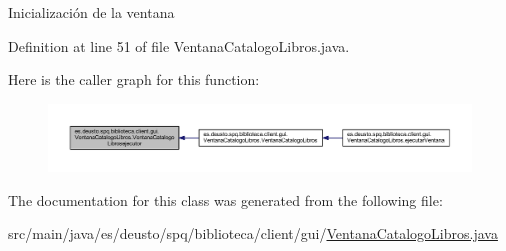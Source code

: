 Inicialización de la ventana 

Definition at line 51 of file Ventana\+Catalogo\+Libros.\+java.

Here is the caller graph for this function\+:
\nopagebreak
\begin{figure}[H]
\begin{center}
\leavevmode
\includegraphics[width=350pt]{classes_1_1deusto_1_1spq_1_1biblioteca_1_1client_1_1gui_1_1_ventana_catalogo_libros_a269ed9764cf7fde7566c875b100ae4de_icgraph}
\end{center}
\end{figure}


The documentation for this class was generated from the following file\+:\begin{DoxyCompactItemize}
\item 
src/main/java/es/deusto/spq/biblioteca/client/gui/\mbox{\hyperlink{_ventana_catalogo_libros_8java}{Ventana\+Catalogo\+Libros.\+java}}\end{DoxyCompactItemize}
